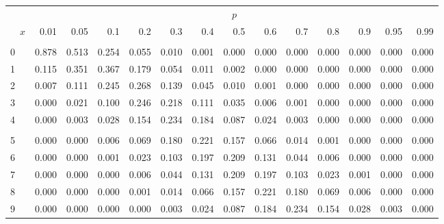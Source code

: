 \documentclass[
]{article}
\begin{document}
\begin{table}[H]
\centering
\begin{tabular}{lrrrrrrrrrrrrr}
\toprule
\multicolumn{1}{c}{ } & \multicolumn{13}{c}{$p$} \\
\cmidrule(l{3pt}r{3pt}){2-14}
$\hspace{1em}x$ & 0.01 & 0.05 & 0.1 & 0.2 & 0.3 & 0.4 & 0.5 & 0.6 & 0.7 & 0.8 & 0.9 & 0.95 & 0.99\\
\midrule
\addlinespace[0.3em]
\multicolumn{14}{l}{$n=13$}\\
\hspace{1em}0 & 0.878 & 0.513 & 0.254 & 0.055 & 0.010 & 0.001 & 0.000 & 0.000 & 0.000 & 0.000 & 0.000 & 0.000 & 0.000\\
\hspace{1em}1 & 0.115 & 0.351 & 0.367 & 0.179 & 0.054 & 0.011 & 0.002 & 0.000 & 0.000 & 0.000 & 0.000 & 0.000 & 0.000\\
\hspace{1em}2 & 0.007 & 0.111 & 0.245 & 0.268 & 0.139 & 0.045 & 0.010 & 0.001 & 0.000 & 0.000 & 0.000 & 0.000 & 0.000\\
\hspace{1em}3 & 0.000 & 0.021 & 0.100 & 0.246 & 0.218 & 0.111 & 0.035 & 0.006 & 0.001 & 0.000 & 0.000 & 0.000 & 0.000\\
\hspace{1em}4 & 0.000 & 0.003 & 0.028 & 0.154 & 0.234 & 0.184 & 0.087 & 0.024 & 0.003 & 0.000 & 0.000 & 0.000 & 0.000\\
\addlinespace[-.7em]
\multicolumn{14}{l}{ }\\
\hspace{1em}5 & 0.000 & 0.000 & 0.006 & 0.069 & 0.180 & 0.221 & 0.157 & 0.066 & 0.014 & 0.001 & 0.000 & 0.000 & 0.000\\
\hspace{1em}6 & 0.000 & 0.000 & 0.001 & 0.023 & 0.103 & 0.197 & 0.209 & 0.131 & 0.044 & 0.006 & 0.000 & 0.000 & 0.000\\
\hspace{1em}7 & 0.000 & 0.000 & 0.000 & 0.006 & 0.044 & 0.131 & 0.209 & 0.197 & 0.103 & 0.023 & 0.001 & 0.000 & 0.000\\
\hspace{1em}8 & 0.000 & 0.000 & 0.000 & 0.001 & 0.014 & 0.066 & 0.157 & 0.221 & 0.180 & 0.069 & 0.006 & 0.000 & 0.000\\
\hspace{1em}9 & 0.000 & 0.000 & 0.000 & 0.000 & 0.003 & 0.024 & 0.087 & 0.184 & 0.234 & 0.154 & 0.028 & 0.003 & 0.000\\

\end{tabular}
\end{table}
\end{document}
